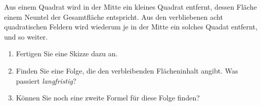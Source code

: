 \item Aus einem Quadrat wird in der Mitte ein kleines Quadrat entfernt, dessen Fläche einem Neuntel der Gesamtfläche entspricht. Aus den verbliebenen acht quadratischen Feldern wird wiederum je in der Mitte ein solches Quadat entfernt, und so weiter.
\begin{enumerate}
\item Fertigen Sie eine Skizze dazu an.
\item Finden Sie eine Folge, die den verbleibenden Flächeninhalt angibt. Was passiert \textit {langfristig}?
\item Können Sie noch eine zweite Formel für diese Folge finden?
\end{enumerate}

